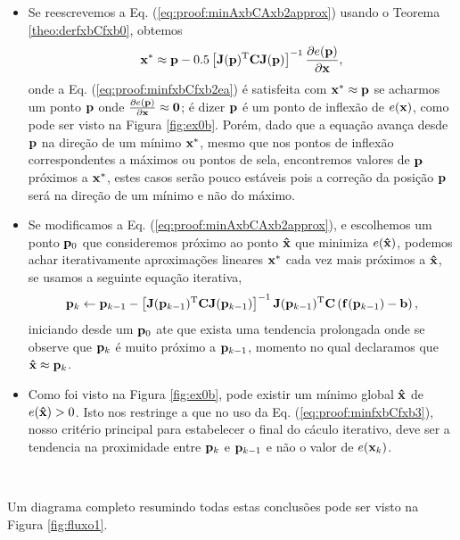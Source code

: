 \begin{myproofT}
\begin{itemize}
\item Se reescrevemos a Eq. (\ref{eq:proof:minAxbCAxb2approx}) usando o Teorema \ref{theo:derfxbCfxb0},
obtemos
\begin{equation}\label{eq:proof:minfxbCfxb2ea}
\VECTOR{x}^* \approx \VECTOR{p} -
0.5 \left[ \MATRIX{J}(\VECTOR{p})^{\transpose}\MATRIX{C} \MATRIX{J}(\VECTOR{p}) \right]^{-1}
\frac{\partial e(\VECTOR{p})}{\partial \VECTOR{x} },
\end{equation}
onde a Eq. (\ref{eq:proof:minfxbCfxb2ea}) é satisfeita 
com $\VECTOR{x}^* \approx \VECTOR{p}$
se acharmos um  ponto $\VECTOR{p}$ onde  
$\frac{\partial e(\VECTOR{p})}{\partial \VECTOR{x} }\approx \VECTOR{0}$; 
é dizer $\VECTOR{p}$ é um ponto de inflexão de $e(\VECTOR{x})$, como pode ser visto na Figura \ref{fig:ex0b}.
Porém, dado que a equação avança desde $\VECTOR{p}$ na direção de um mínimo $\VECTOR{x}^*$, 
mesmo que nos pontos de inflexão correspondentes a máximos ou pontos de sela,
encontremos valores de $\VECTOR{p}$ próximos a $\VECTOR{x}^*$,
 estes casos serão pouco estáveis pois
a correção da posição $\VECTOR{p}$ será na direção de um mínimo e não do máximo.

\item Se modificamos a Eq. (\ref{eq:proof:minAxbCAxb2approx}), e escolhemos um ponto  
$\VECTOR{p}_0$ que consideremos próximo ao ponto $\VECTOR{\hat{x}}$ que minimiza $e(\VECTOR{\hat{x}})$,
podemos achar iterativamente aproximações lineares $\VECTOR{x}^*$ cada vez mais próximos a  $\VECTOR{\hat{x}}$,
se usamos a seguinte equação iterativa,
\begin{equation}\label{eq:proof:minfxbCfxb3}
\VECTOR{p}_{k} \leftarrow \VECTOR{p}_{k-1} -
\left[ \MATRIX{J}(\VECTOR{p}_{k-1})^{\transpose}\MATRIX{C} \MATRIX{J}(\VECTOR{p}_{k-1}) \right]^{-1}
\MATRIX{J}(\VECTOR{p}_{k-1})^{\transpose}\MATRIX{C} \left(\VECTOR{f}(\VECTOR{p}_{k-1})-\VECTOR{b}\right),
\end{equation}
iniciando desde um $\VECTOR{p}_{0}$ 
ate que exista uma tendencia prolongada onde se observe que $\VECTOR{p}_{k}$ é muito próximo a $\VECTOR{p}_{k-1}$,
momento no qual declaramos que $\VECTOR{\hat{x}} \approx \VECTOR{p}_{k}$.
\item Como foi visto na Figura  \ref{fig:ex0b},
pode existir um mínimo global $\VECTOR{\hat{x}}$ de $e(\VECTOR{\hat{x}})>0$.
Isto nos restringe a que no uso da Eq. (\ref{eq:proof:minfxbCfxb3}),
nosso critério principal para estabelecer o final do cáculo iterativo,
deve ser a tendencia na  proximidade entre $\VECTOR{p}_{k}$ e $\VECTOR{p}_{k-1}$ 
e não o valor de $e(\VECTOR{x}_k)$.
\end{itemize}~

Um diagrama completo resumindo todas estas conclusões pode ser visto na Figura \ref{fig:fluxo1}.
\end{myproofT}

